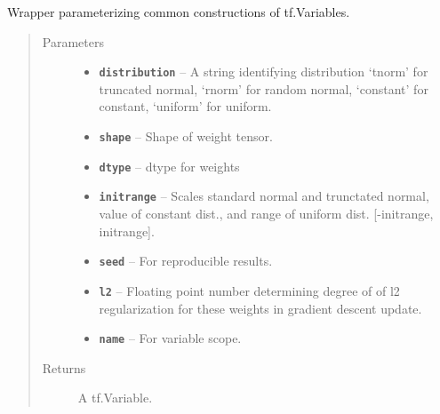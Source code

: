 \documentclass[letterpaper,10pt,english]{sphinxmanual}
\begin{document}
\begin{fulllineitems}
\label{node_ops:node_ops.weights}
Wrapper parameterizing common constructions of tf.Variables.
\begin{quote}\begin{description}
\item[{Parameters}] \leavevmode\begin{itemize}
\item {} 
\textbf{\texttt{distribution}} -- A string identifying distribution `tnorm' for truncated normal, `rnorm' for random normal, `constant' for constant, `uniform' for uniform.

\item {} 
\textbf{\texttt{shape}} -- Shape of weight tensor.

\item {} 
\textbf{\texttt{dtype}} -- dtype for weights

\item {} 
\textbf{\texttt{initrange}} -- Scales standard normal and trunctated normal, value of constant dist., and range of uniform dist. {[}-initrange, initrange{]}.

\item {} 
\textbf{\texttt{seed}} -- For reproducible results.

\item {} 
\textbf{\texttt{l2}} -- Floating point number determining degree of of l2 regularization for these weights in gradient descent update.

\item {} 
\textbf{\texttt{name}} -- For variable scope.

\end{itemize}

\item[{Returns}] \leavevmode
A tf.Variable.

\end{description}\end{quote}

\end{fulllineitems}

\end{document}
